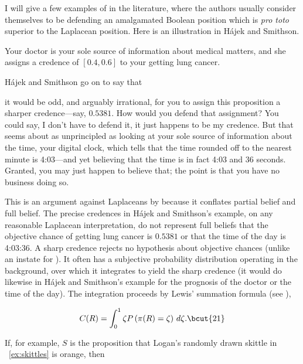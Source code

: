 \documentclass[phd,12pt,oneside]{ubcthesis}
\begin{document}
I will give a few examples of {\anderson} in the literature, where the
authors usually consider themselves to be defending an amalgamated
Boolean position which is \emph{pro toto} superior to the Laplacean
position. Here is an illustration in H{\'a}jek and Smithson.

\begin{quotex}
  \label{ex:crude} Your doctor is your
  sole source of information about medical matters, and she assigns a
  credence of $[0.4,0.6]$ to your getting lung cancer.
\end{quotex}

H{\'a}jek and Smithson go on to say that 

\begin{quotex}
  it would be odd, and arguably irrational, for you to assign this
  proposition a sharper credence---say, $0.5381$. How would you defend
  that assignment? You could say, I don't have to defend it, it just
  happens to be my credence. But that seems about as unprincipled as
  looking at your sole source of information about the time, your
  digital clock, which tells that the time rounded off to the nearest
  minute is 4:03---and yet believing that the time is in fact 4:03 and
  36 seconds. Granted, you may just happen to believe that; the point
  is that you have no business doing so.
\end{quotex}

This is an argument against Laplaceans by {\anderson} because it
conflates partial belief and full belief. The precise credences in
H{\'a}jek and Smithson's example, on any reasonable Laplacean
interpretation, do not represent full beliefs that the objective
chance of getting lung cancer is $0.5381$ or that the time of the day
is 4:03:36. A sharp credence rejects no hypothesis about objective
chances (unlike an instate for {\anderson}). It often has a subjective
probability distribution operating in the background, over which it
integrates to yield the sharp credence (it would do likewise in
H{\'a}jek and Smithson's example for the prognosis of the doctor or
the time of the day). The integration proceeds by Lewis'
summation formula (see ),

\begin{equation}
  \label{eq:s2}
  C(R)=\int_{0}^{1}\zeta{}P\left(\pi(R)=\zeta\right)\,d\zeta{}.\bcut{21}
\end{equation}

{\noindent}If, for example, $S$ is the proposition that Logan's
randomly drawn skittle in {\xample}~\ref{ex:skittles} is orange, then
\end{document}
